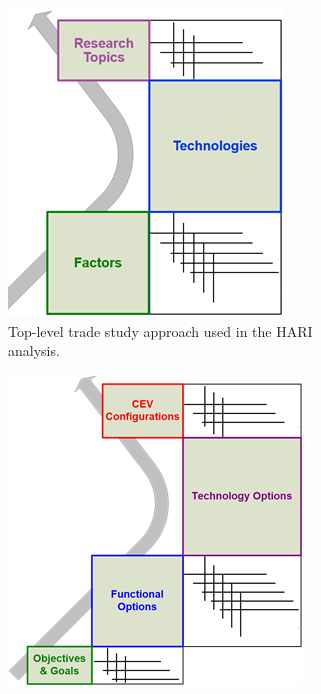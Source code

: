 \begin{figure}[tb!]
    \begin{center}
        \begin{subfigure}{0.49\textwidth}
            \includegraphics[width=\linewidth]{figures/TradeStudy/figure5a.png}
            \caption[Top-level trade study approach used in the HARI analysis]{Top-level trade study approach used in the HARI analysis.}
            \label{figure-hari:tradestudyA}
        \end{subfigure}\hfill
        \begin{subfigure}{0.49\textwidth}
            \includegraphics[width=\linewidth]{figures/TradeStudy/figure5b.png}

\end{subfigure}
\end{center}
\end{figure}
